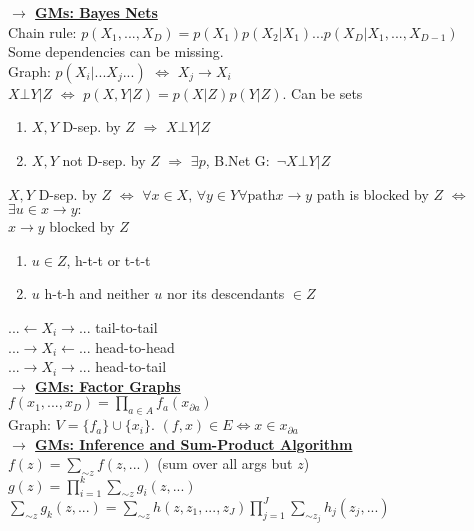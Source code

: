 \documentclass[]{article}
\newcommand{\mytitle}[1]{ {\bf $\rightarrow$ \underline{#1}}\\}
\begin{document}
\begin{multicols*}{2}
\mytitle{GMs: Bayes Nets}
Chain rule: $p(X_1,...,X_D)=p(X_1)p(X_2|X_1)...p(X_D|X_1,...,X_{D-1})$\\
Some dependencies can be missing.\\
Graph: $p(X_i|...X_j...)$ $\Leftrightarrow$ $X_j\to X_i$\\
$X\bot Y|Z$ $\Leftrightarrow$ $p(X, Y|Z)=p(X|Z)p(Y|Z)$. Can be sets\\
\begin{enumerate}
	\item $X, Y$ D-sep. by $Z$ $\Rightarrow$ $X\bot Y|Z$
	\item $X, Y$ not D-sep. by $Z$ $\Rightarrow$ $\exists p$, B.Net G$\colon$ $\neg X\bot Y|Z$
\end{enumerate}
$X,Y$ D-sep. by $Z$ $\Leftrightarrow$ $\forall x\in X,\,\forall y\in Y \forall \mbox{path} x\to y$ path is blocked by $Z$ $\Leftrightarrow$ $\exists u\in x\to y\colon$\\
$x\to y$ blocked by $Z$
\begin{enumerate}
	\item $u\in Z$, h-t-t or t-t-t
	\item $u$ h-t-h and neither $u$ nor its descendants $\in Z$
\end{enumerate}
$...\leftarrow X_i\rightarrow...$ tail-to-tail\\
$...\rightarrow X_i\leftarrow...$ head-to-head\\
$...\rightarrow X_i\rightarrow...$ head-to-tail\\
\mytitle{GMs: Factor Graphs}
$f(x_1,...,x_D)=\prod\limits_{a\in A}f_a(x_{\partial a})$\\
Graph: $V=\{f_a\}\cup\{x_i\}$. $(f,x)\in E\Leftrightarrow x\in x_{\partial a}$\\

\mytitle{GMs: Inference and Sum-Product Algorithm}
$f(z)=\sum\limits_{\sim z}f(z,...)$ (sum over all args but $z$)\\
$g(z)=\prod\limits_{i=1}^k\sum\limits_{\sim z}g_i(z,...)$\\
$\sum\limits_{\sim z}g_k(z,...)=\sum\limits_{\sim z}h(z,z_1,...,z_J)\prod\limits_{j=1}^J\sum\limits_{\sim z_j}h_j(z_j,...)$

\end{multicols*}
\end{document}
